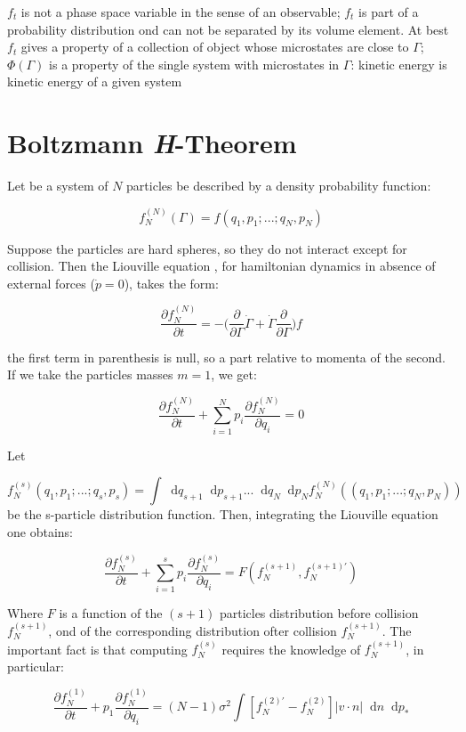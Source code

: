 \documentclass{article}
\newcommand*\diff{\mathop{}\!\mathrm{d}}
\begin{document}
$f_t$ is not a phase space variable in the sense of an observable; $f_t$ is part of a probability distribution ond can not be separated by its volume element. At best $f_t$ gives a property of a collection of object whose microstates are close to $\Gamma$; $\Phi(\Gamma)$ is a property of the single system with microstates in $\Gamma$: kinetic energy is kinetic energy of a given system


\newpage 
\section{Boltzmann \textit{H}-Theorem}


Let be a system of $N$ particles be described by a density probability function:

$$f_N^{(N)}(\Gamma) = f(q_1,p_1;...;q_N,p_N)$$

Suppose the particles are hard spheres, so they do not interact except for collision. Then the Liouville equation , for hamiltonian dynamics in absence of external forces ($\dot{p}=0$), takes the form:

$$ \frac{\partial f_N^{(N)}}{\partial t} = - \Big( \frac{\partial}{\partial \Gamma} \dot{\Gamma} + \dot{\Gamma} \frac{\partial}{\partial \Gamma} \Big) f  $$

the first term in parenthesis is null, so a part relative to momenta of the second. If we take the particles masses $m=1$, we get:

$$ \frac{\partial f_N^{(N)}}{\partial t} + \sum_{i=1}^{N} p_i \frac{ \partial f_N^{(N)} }{ \partial q_i}  = 0$$

Let

$$f_N^{(s)}(q_1,p_1;...;q_s,p_s) = \int \diff q_{s+1} \diff p_{s+1} ... \diff q_N \diff p_N f_N^{(N)}((q_1,p_1;...;q_N,p_N)) $$
 be the s-particle distribution function. Then, integrating the Liouville equation one obtains:
 
 $$  \frac{\partial f_N^{(s)}}{\partial t} + \sum_{i=1}^{s} p_i \frac{ \partial f_N^{(s)} }{ \partial q_i} = F( f_N^{(s+1)}, f_N^{(s+1)'} )$$
 
Where $F$ is a function of the $(s+1)$ particles distribution before collision $f_N^{(s+1)}$, ond of the corresponding distribution ofter collision $f_N^{(s+1)}$.
The important fact is that computing $f_N^{(s)}$ requires the knowledge of $f_N^{(s+1)}$, in particular:

$$ \frac{\partial f_N^{(1)}}{\partial t} + p_1 \frac{ \partial f_N^{(1)} }{ \partial q_i}  = (N-1) \sigma^2 \int [f_N^{(2)'} - f_N^{(2)} ] |v \cdot n | \diff n \diff p_{\ast}$$
\end{document}
